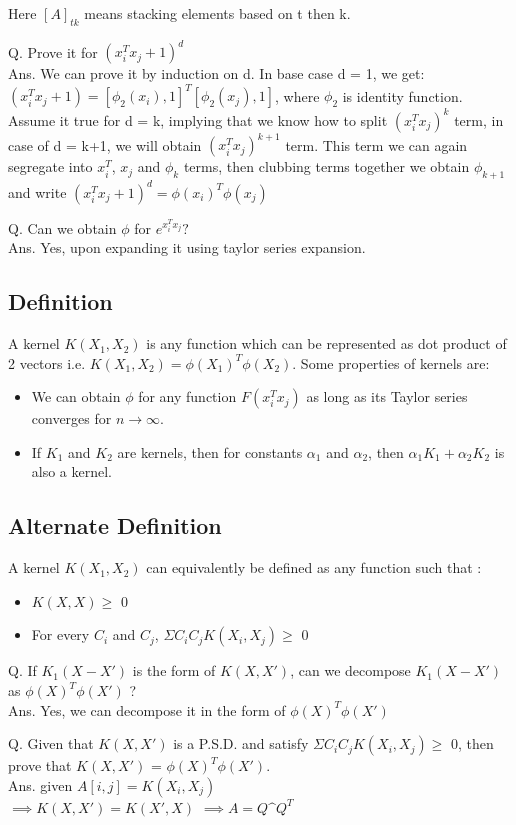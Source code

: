 \documentclass[11pt, twosides]{article}
\begin{document}
Here $[A]_{tk}$ means stacking elements based on t then k.
\begin{flushleft}
\color{blue}
Q. Prove it for $(x_{i}^Tx_j + 1)^d$ \\
Ans. We can prove it by induction on d. In base case d = 1, we get: $(x_{i}^Tx_j + 1) = [\phi_2(x_i), 1]^T[\phi_2(x_j), 1]$, where $\phi_2$ is identity function. Assume it true for d = k, implying that we know how to split $(x_{i}^Tx_j)^k$ term, in case of d = k+1, we will obtain $(x_{i}^Tx_j)^{k+1}$ term. This term we can again segregate into $x_{i}^T$, $x_j$ and $\phi_{k}$ terms, then clubbing terms together we obtain $\phi_{k+1}$ and write $(x_{i}^Tx_j + 1)^d = \phi(x_i)^T\phi(x_j)$

Q. Can we obtain $\phi$ for $e^{x_{i}^Tx_j} ?$ \\
Ans. Yes, upon expanding it using taylor series expansion. 
\end{flushleft}
\subsection{Definition}
A kernel $K(X_1,X_2)$ is any function which can be represented as dot product of 2 vectors i.e. $K(X_1,X_2) = \phi(X_{1})^T \phi(X_2)$. Some properties of kernels are: 
\begin{itemize}
    \item We can obtain $\phi$ for any function $F(x_{i}^Tx_{j})$ as long as its Taylor series converges for $n \to \infty$.
    \item If $K_{1}$ and $K_{2}$ are kernels, then for constants $\alpha_1$ and $\alpha_2$, then  $\alpha_{1}K_{1}+\alpha_{2}K_{2}$ is also a kernel. 
\end{itemize}

\subsection{Alternate Definition}
A kernel $K(X_1,X_2)$ can equivalently be defined as any function such that : 
\begin{itemize}
    \item $K(X,X) \geq$ 0
    \item For  every  $C_i$ and $C_j$, $\Sigma C_i C_j K(X_i,X_j) \geq$ 0
\end{itemize}

\begin{flushleft}
\color{blue}
Q. If $K_1(X-X')$ is the form of $K(X,X')$, can we decompose $K_1(X-X')$ as $\phi(X)^T\phi(X')$ ? \\
Ans. Yes, we can decompose it in the form of $\phi(X)^T\phi(X')$ 

Q. Given that $K(X,X')$ is a P.S.D. and satisfy $\Sigma C_i C_j K(X_i,X_j) \geq$ 0, then prove that $K(X,X')$ = $\phi(X)^T\phi(X')$.\\
Ans. given $A[i,j] = K(X_i,X_j)$\\
$\implies K(X,X') = K(X',X)$
$\implies A = Q\^Q^T$
\end{flushleft}
\end{document}
